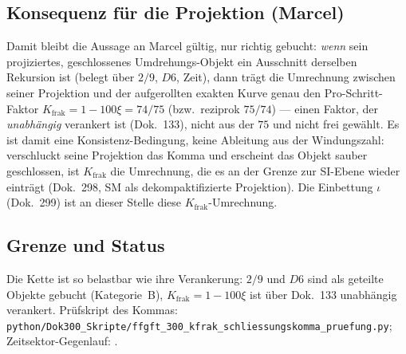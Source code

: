 \subsection*{Konsequenz für die Projektion (Marcel)}

Damit bleibt die Aussage an Marcel gültig, nur richtig gebucht: \emph{wenn}
sein projiziertes, geschlossenes Umdrehungs-Objekt ein Ausschnitt derselben
Rekursion ist (belegt über $2/9$, $D6$, Zeit), dann trägt die Umrechnung
zwischen seiner Projektion und der aufgerollten exakten Kurve genau den
Pro-Schritt-Faktor $K_{\text{frak}}=1-100\xi=74/75$ (bzw.\ reziprok $75/74$)
--- einen Faktor, der \emph{unabhängig} verankert ist (Dok.~133), nicht aus der
$75$ und nicht frei gewählt. Es ist damit eine Konsistenz-Bedingung, keine
Ableitung aus der Windungszahl: verschluckt seine Projektion das Komma und
erscheint das Objekt sauber geschlossen, ist $K_{\text{frak}}$ die Umrechnung,
die es an der Grenze zur SI-Ebene wieder einträgt (Dok.~298, SM als
dekompaktifizierte Projektion). Die Einbettung $\iota$ (Dok.~299) ist an dieser
Stelle diese $K_{\text{frak}}$-Umrechnung.

\subsection*{Grenze und Status}

Die Kette ist so belastbar wie ihre Verankerung: $2/9$ und $D6$ sind als
geteilte Objekte gebucht (Kategorie~B), $K_{\text{frak}}=1-100\xi$ ist über
Dok.~133 unabhängig verankert. Prüfskript des Kommas:
\texttt{python/Dok300\_Skripte/ffgft\_300\_kfrak\_schliessungskomma\_pruefung.py};
Zeitsektor-Gegenlauf: .
